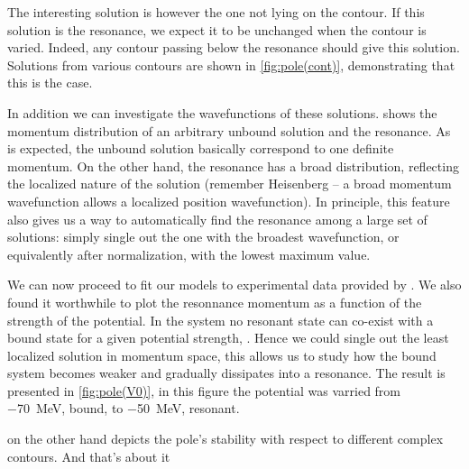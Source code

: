 \documentclass[../main/report.tex]{subfiles}
\begin{document}
The interesting solution is however the one not lying on the contour. If this solution is the resonance, we expect it to be unchanged when the contour is varied. Indeed, any contour passing below the resonance should give this solution. Solutions from various contours are shown in \cref{fig:pole(cont)}, demonstrating that this is the case.

In addition we can investigate the wavefunctions of these solutions.  shows the momentum distribution of an arbitrary unbound solution and the resonance. As is expected, the unbound solution basically correspond to one definite momentum. On the other hand, the resonance has a broad distribution, reflecting the localized nature of the solution (remember Heisenberg -- a broad momentum wavefunction allows a localized position wavefunction). In principle, this feature also gives us a way to automatically find the resonance among a large set of solutions: simply single out the one with the broadest wavefunction, or equivalently after normalization, with the lowest maximum value. 

We can now proceed to fit our models to experimental data provided by \cite{inte jimmy i alla fall}. 
We also found it worthwhile to plot the resonnance momentum as a function of the strength of the potential. 
In the  system no resonant state can co-exist with a bound state for a given potential strength, \cite{spill?}. 
Hence we could single out the least localized solution in momentum space, this allows us to study how the bound system becomes weaker and gradually dissipates into a resonance. 
The result is presented in \cref{fig:pole(V0)}, in this figure the potential was varried from \SI{-70}{MeV}, bound, to \SI{-50}{MeV}, resonant.

 on the other hand depicts the pole's stability with respect to different complex contours. And that's about it 
\end{document}
